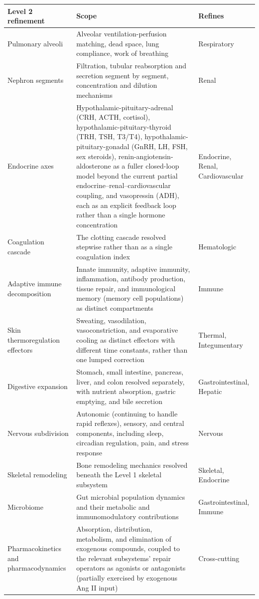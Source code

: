 \documentclass[11pt]{article}
\begin{document}
\begin{longtable}{@{}p{2.6cm}p{7.3cm}p{2.8cm}@{}}
\toprule
Level 2 refinement & Scope & Refines \\
\midrule
\endhead
Pulmonary alveoli & Alveolar ventilation-perfusion matching, dead space, lung compliance, work of breathing & Respiratory \\
Nephron segments & Filtration, tubular reabsorption and secretion segment by segment, concentration and dilution mechanisms & Renal \\
Endocrine axes & Hypothalamic-pituitary-adrenal (CRH, ACTH, cortisol), hypothalamic-pituitary-thyroid (TRH, TSH, T3/T4), hypothalamic-pituitary-gonadal (GnRH, LH, FSH, sex steroids), renin-angiotensin-aldosterone as a fuller closed-loop model beyond the current partial endocrine--renal--cardiovascular coupling, and vasopressin (ADH), each as an explicit feedback loop rather than a single hormone concentration & Endocrine, Renal, Cardiovascular \\
Coagulation cascade & The clotting cascade resolved stepwise rather than as a single coagulation index & Hematologic \\
Adaptive immune decomposition & Innate immunity, adaptive immunity, inflammation, antibody production, tissue repair, and immunological memory (memory cell populations) as distinct compartments & Immune \\
Skin thermoregulation effectors & Sweating, vasodilation, vasoconstriction, and evaporative cooling as distinct effectors with different time constants, rather than one lumped correction & Thermal, Integumentary \\
Digestive expansion & Stomach, small intestine, pancreas, liver, and colon resolved separately, with nutrient absorption, gastric emptying, and bile secretion & Gastrointestinal, Hepatic \\
Nervous subdivision & Autonomic (continuing to handle rapid reflexes), sensory, and central components, including sleep, circadian regulation, pain, and stress response & Nervous \\
Skeletal remodeling & Bone remodeling mechanics resolved beneath the Level 1 skeletal subsystem & Skeletal, Endocrine \\
Microbiome & Gut microbial population dynamics and their metabolic and immunomodulatory contributions & Gastrointestinal, Immune \\
Pharmacokinetics and pharmacodynamics & Absorption, distribution, metabolism, and elimination of exogenous compounds, coupled to the relevant subsystems' repair operators as agonists or antagonists (partially exercised by exogenous Ang II input) & Cross-cutting \\

\end{longtable}
\end{document}
